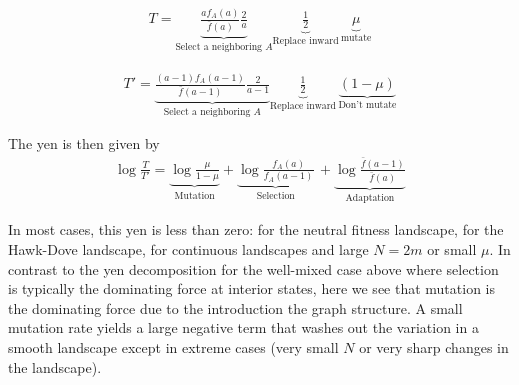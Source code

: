\documentclass[aps,prd,11pt,notitlepage,nofootinbib,superscriptaddress,showkeys,letterpaper]{revtex4-1}
\begin{document}
\begin{align*} 
T = \underbrace{\frac{a f_A(a)}{\bar{f}(a)} \frac{2}{a}}_{\text{Select a neighboring $A$}}
\underbrace{\frac{1}{2}}_{\text{Replace inward}} \,
\underbrace{\mu}_{\text{mutate}}
\end{align*}

\begin{align*} 
T' = \underbrace{\frac{(a-1) f_A(a-1)}{\bar{f}(a-1)} \frac{2}{a-1}}_{\text{Select a neighboring $A$}}
\underbrace{\frac{1}{2}}_{\text{Replace inward}} \,
\underbrace{(1 - \mu)}_{\text{Don't mutate}}
\end{align*}

The yen is then given by
\begin{align*} 
\log \frac{T}{T'} = \underbrace{\log \frac{\mu}{1 - \mu}}_{\text{Mutation}}
+ \underbrace{\log \frac{f_A(a)}{f_A(a-1)}}_{\text{Selection}} \,
+ \underbrace{\log \frac{\bar{f}(a-1)}{\bar{f}(a)}}_{\text{Adaptation}}
\end{align*}

In most cases, this yen is less than zero: for the neutral fitness landscape, for the Hawk-Dove
landscape, for continuous landscapes and large $N=2m$ or small $\mu$. In contrast to the
yen decomposition for the well-mixed case above where selection is typically
the dominating force at interior states, here we see that mutation is the dominating
force due to the introduction the graph structure. A small mutation rate yields
a large negative term that washes out the variation in a smooth landscape except
in extreme cases (very small $N$ or very sharp changes in the landscape).
\end{document}
